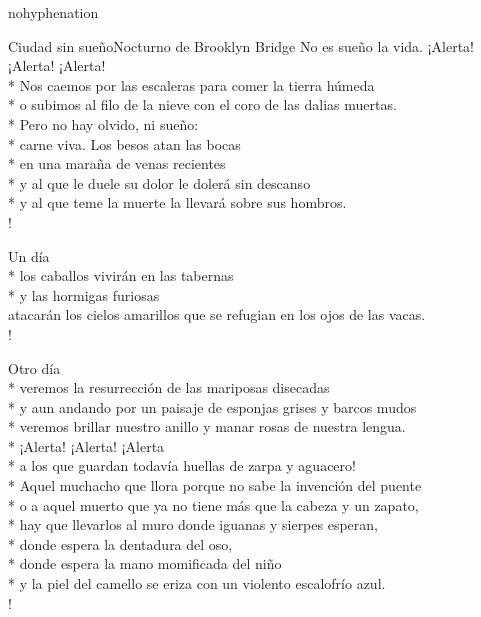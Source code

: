 \documentclass[
    a5paper,
    DIV=10,
    12pt,
    notitlepage,
    oneside,]
{scrbook} %
\begin{document}
\begin{hyphenrules}{nohyphenation}
\begin{poem}{Ciudad sin sueño}{Nocturno de Brooklyn Bridge}{}
No es sueño la vida. ¡Alerta! ¡Alerta! ¡Alerta!\\*
Nos caemos por las escaleras para comer la tierra húmeda\\*
o subimos al filo de la nieve con el coro de las dalias muertas.\\*
Pero no hay olvido, ni sueño:\\*
carne viva. Los besos atan las bocas\\*
en una maraña de venas recientes\\*
y al que le duele su dolor le dolerá sin descanso\\*
y al que teme la muerte la llevará sobre sus hombros.\\!

Un día\\*
los caballos vivirán en las tabernas\\*
y las hormigas furiosas\\

atacarán los cielos amarillos que se refugian en los ojos de las vacas.\\!

Otro día\\*
veremos la resurrección de las mariposas disecadas\\*
y aun andando por un paisaje de esponjas grises y barcos mudos\\*
veremos brillar nuestro anillo y manar rosas de nuestra lengua.\\*
¡Alerta! ¡Alerta! ¡Alerta\\*
a los que guardan todavía huellas de zarpa y aguacero!\\*
Aquel muchacho que llora porque no sabe la invención del puente\\*
o a aquel muerto que ya no tiene más que la cabeza y un zapato,\\*
hay que llevarlos al muro donde iguanas y sierpes esperan,\\*
donde espera la dentadura del oso,\\*
donde espera la mano momificada del niño\\*
y la piel del camello se eriza con un violento escalofrío azul.\\!


\end{poem}
\end{hyphenrules}
\end{document}
